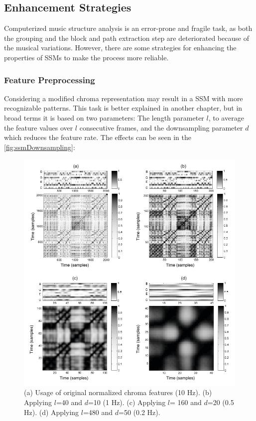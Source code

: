 \documentclass[a4paper, 9pt, twocolumn]{extarticle}
\begin{document}
\subsection{Enhancement Strategies}
\label{subsection:ssmEnhancement}

Computerized music structure analysis is an error-prone and fragile task, as both the grouping and the block and path extraction step are deteriorated because of the musical variations. However, there are some strategies for enhancing the properties of SSMs to make the process more reliable. 

\subsubsection{Feature Preprocessing}
\label{subsubsection:ssmEnhancementFeaturePreprocessing}

Considering a modified chroma representation may result in a SSM with more recognizable patterns. This task is better explained in another chapter, but in broad terms it is based on two parameters: The length parameter $l$, to average the feature values over $l$ consecutive frames, and the downsampling parameter $d$ which reduces the feature rate. The effects can be seen in the \autoref{fig:ssmDownsampling}:


\begin{figure}[h!]
	\centering
	\includegraphics[width=\linewidth]{images/ssmDownsampling.png}
	\caption{(a) Usage of original normalized chroma features (10 Hz). (b) Applying $l$=40 and $d$=10 (1 Hz). (c) Applying $l$= 160 and $d$=20 (0.5 Hz). (d) Applying $l$=480 and $d$=50 (0.2 Hz).}
	 \label{fig:ssmDownsampling}
\end{figure}
\end{document}
